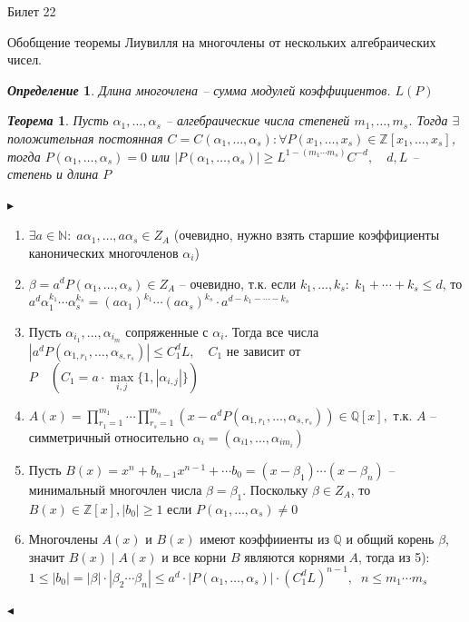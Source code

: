 \documentclass[a4paper,12pt]{article}
\newtheorem{deff}{\textit{Определение}}
\newtheorem{teo}{\textit{Теорема}}
\newcommand{\AL}{\alpha}
\newcommand{\q}{\quad}
\newcommand{\pb}{\blacktriangleright}
\newcommand{\pe}{\blacktriangleleft}
\newcommand{\bb}[1]{\mathbb{#1}}
\begin{document}
\newpage
\begin{mybox2}{\hypertarget{bil22}{Билет 22}}

\begin{formbox}{}
Обобщение теоремы Лиувилля на многочлены от нескольких алгебраических чисел.
\end{formbox}
\begin{formbox}{}
\begin{deff} Длина многочлена -- сумма модулей коэффициентов. $L(P)$
\end{deff}
\end{formbox}

\begin{formbox}{}
\begin{teo} Пусть $\AL_1,\dots,\AL_s$ -- алгебраические числа степеней $m_1,\dots, m_s$. Тогда $\exists$ положительная постоянная $C = C(\AL_1, \dots, \AL_s): \forall P(x_1,\dots,x_s)\in\bb{Z}[x_1,\dots,x_s]$, тогда $P(\AL_1, \dots, \AL_s) = 0$  или $|P(\AL_1, \dots, \AL_s)|\ge L^{1-(m_1\cdots m_s)}C^{-d}, \q d,L$ -- степень и длина $P$
\end{teo}
\end{formbox}
$\pb$
\begin{enumerate}
\item $\exists a\in\bb{N}: \; a\AL_1,\dots,a\AL_s\in Z_A$ (очевидно, нужно взять старшие коэффициенты канонических многочленов $\AL_i$)
\item $\beta = a^d P(\AL_1,\dots,\AL_s) \in Z_A$ -- очевидно, т.к. если $k_1,\dots, k_s:\; k_1 + \cdots + k_s \le d$, то $a^d \AL_1^{k_1}\cdots\AL_s^{k_s} = (a\AL_1)^{k_1}\cdots(a\AL_s)^{k_s}\cdot a^{d-k_1 - \cdots - k_s}$
\item Пусть $\AL_{i_1},\dots,\AL_{i_m}$ сопряженные с $\AL_i$. Тогда все числа $|a^d P(\AL_{1,r_1},\dots,\AL_{s,r_s})| \le C_1^dL,\q C_1$ не зависит от $P\q (C_1 = a\cdot \max\limits_{i,j}\{1, |\AL_{i,j}|\})$
\item $A(x) = \prod\limits_{r_1=1}^{m_1} \cdots \prod\limits_{r_s=1}^{m_s} (x - a^dP(\AL_{1,r_1}, \dots,\AL_{s,r_s})) \in \bb{Q}[x],$  т.к. $A$ -- симметричный относительно $\AL_i = (\AL_{i1}, \dots,\AL_{im_i})$
\item Пусть $B(x) = x^n + b_{n-1}x^{n-1} + \cdots b_0 = (x-\beta_1)\cdots(x-\beta_n) $ -- минимальный многочлен числа $\beta = \beta_1$. Поскольку $\beta\in Z_A$, то $B(x)\in \bb{Z}[x], |b_0|\ge 1$ если $P(\AL_1,\dots,\AL_s) \not=0$ \\
\item Многочлены $A(x)$ и $B(x)$ имеют коэффииенты из $\bb{Q}$ и общий корень $\beta$, значит $B(x)\mid A(x)$ и все корни $B$ являются корнями $A$, тогда из 5): $1 \le |b_0| = |\beta|\cdot|\beta_2 \cdots \beta_n| \le a^d\cdot |P(\AL_1, \dots, \AL_s)|\cdot(C_1^d L)^{n-1},\;\; n \le m_1\cdots m_s$
\end{enumerate}
$\pe$
\end{mybox2}
\end{document}
